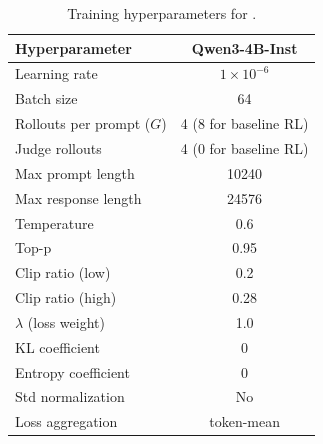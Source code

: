 \begin{table}[h]
\centering
\caption{Training hyperparameters for \method{}.}
\label{tab:training_hyperparams}
\begin{tabular}{lc}
\toprule
\textbf{Hyperparameter} & \textbf{Qwen3-4B-Inst} \\
\midrule
Learning rate & $1 \times 10^{-6}$ \\
Batch size & 64 \\
Rollouts per prompt ($G$) & 4 (8 for baseline RL) \\
Judge rollouts & 4 (0 for baseline RL) \\
Max prompt length & 10240 \\
Max response length & 24576 \\
Temperature & 0.6 \\
Top-p & 0.95 \\
Clip ratio (low) & 0.2 \\
Clip ratio (high) & 0.28 \\
$\lambda$ (loss weight) & 1.0 \\
KL coefficient & 0 \\
Entropy coefficient & 0 \\
Std normalization & No \\
Loss aggregation & token-mean \\
\bottomrule
\end{tabular}
\end{table}


